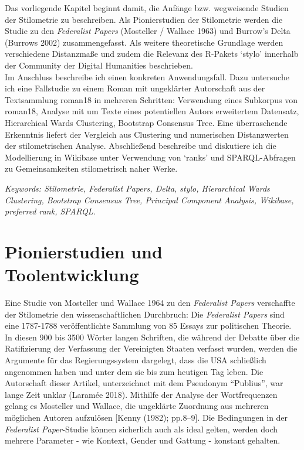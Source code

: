 \documentclass[
  12pt,
  letterpaper,
  DIV=11,
  numbers=noendperiod]{scrreprt}
\begin{document}
Das vorliegende Kapitel beginnt damit, die Anfänge bzw. wegweisende
Studien der Stilometrie zu beschreiben. Als Pionierstudien der
Stilometrie werden die Studie zu den \emph{Federalist Papers} (Mosteller
/ Wallace 1963) und Burrow's Delta (Burrows 2002) zusammengefasst. Als
weitere theoretische Grundlage werden verschiedene Distanzmaße und zudem
die Relevanz des R-Pakets `stylo' innerhalb der Community der Digital
Humanities beschrieben.\\
Im Anschluss beschreibe ich einen konkreten Anwendungsfall. Dazu
untersuche ich eine Fallstudie zu einem Roman mit ungeklärter
Autorschaft aus der Textsammlung roman18 in mehreren Schritten:
Verwendung eines Subkorpus von roman18, Analyse mit um Texte eines
potentiellen Autors erweitertem Datensatz, Hierarchical Wards
Clustering, Bootstrap Consensus Tree. Eine überraschende Erkenntnis
liefert der Vergleich aus Clustering und numerischen Distanzwerten der
stilometrischen Analyse. Abschließend beschreibe und diskutiere ich die
Modellierung in Wikibase unter Verwendung von `ranks' und
SPARQL-Abfragen zu Gemeinsamkeiten stilometrisch naher Werke.

\emph{Keywords: Stilometrie, Federalist Papers, Delta, stylo,
Hierarchical Wards Clustering, Bootstrap Consensus Tree, Principal
Component Analysis, Wikibase, preferred rank, SPARQL.}

\section{Pionierstudien und
Toolentwicklung}\label{pionierstudien-und-toolentwicklung}

Eine Studie von Mosteller und Wallace 1964 zu den \emph{Federalist
Papers} verschaffte der Stilometrie den wissenschaftlichen Durchbruch:
Die \emph{Federalist Papers} sind eine 1787-1788 veröffentlichte
Sammlung von 85 Essays zur politischen Theorie. In diesen 900 bis 3500
Wörter langen Schriften, die während der Debatte über die Ratifizierung
der Verfassung der Vereinigten Staaten verfasst wurden, werden die
Argumente für das Regierungssystem dargelegt, dass die USA schließlich
angenommen haben und unter dem sie bis zum heutigen Tag leben. Die
Autorschaft dieser Artikel, unterzeichnet mit dem Pseudonym ``Publius'',
war lange Zeit unklar (Laramée 2018). Mithilfe der Analyse der
Wortfrequenzen gelang es Mosteller und Wallace, die ungeklärte Zuordnung
aus mehreren möglichen Autoren aufzulösen {[}Kenny (1982); pp.8--9{]}.
Die Bedingungen in der \emph{Federalist Paper}-Studie können sicherlich
auch als ideal gelten, werden doch mehrere Parameter - wie Kontext,
Gender und Gattung - konstant gehalten.
\end{document}
